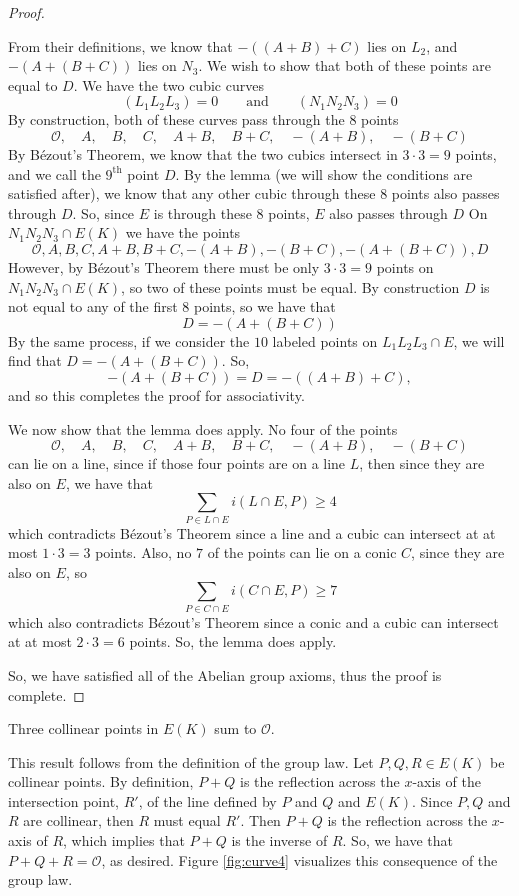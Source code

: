 \documentclass[]{math_paper}
\begin{document}
\begin{proof}
\begin{enumerate} [label = (\roman*)]
              From their definitions, we know that $-((A + B) + C)$ lies on $L_2$, and $-(A + (B + C))$ lies on $N_3$. We wish to show that both of these points are equal to $D$. We have the two cubic curves
              $$(L_1L_2L_3)= 0 \qquad \text{and} \qquad (N_1N_2N_3) = 0$$
              By construction, both of these curves pass through the $8$ points
              $$\mathcal{O}, \quad A, \quad B, \quad C, \quad A + B, \quad B + C, \quad -(A + B), \quad -(B + C)$$
              By Bézout's Theorem, we know that the two cubics intersect in $3 \cdot 3 = 9$ points, and we call the $9^{\text{th}}$ point $D$. By the lemma (we will show the conditions are satisfied after), we know that any other cubic through these $8$ points also passes through $D$. So, since $E$ is through these $8$ points, $E$ also passes through $D$ On $N_1N_2N_3 \cap E(K)$ we have the points
              $$\mathcal{O}, A, B, C, A+B, B+C, -(A + B), -(B + C), -(A + (B+C)), D$$
              However, by Bézout's Theorem there must be only $3 \cdot 3 = 9$ points on $N_1N_2N_3 \cap E(K)$, so two of these points must be equal. By construction $D$ is not equal to any of the first $8$ points, so we have that
              $$D = -(A + (B + C))$$
              By the same process, if we consider the $10$ labeled points on $L_1L_2L_3 \cap E$, we will find that $D = -(A + (B + C))$. So,
              $$-(A + (B + C)) = D = -((A + B) + C),$$
              and so this completes the proof for associativity.

              We now show that the lemma does apply. No four of the points
              $$\mathcal{O}, \quad A, \quad B, \quad C, \quad A + B, \quad B + C, \quad -(A + B), \quad -(B + C)$$
              can lie on a line, since if those four points are on a line $L$, then since they are also on $E$, we have that $$\sum_{P \in L \cap E}i(L \cap E, P) \geq 4$$
              which contradicts Bézout's Theorem since a line and a cubic can intersect at at most $1 \cdot 3 = 3$ points. Also, no $7$ of the points can lie on a conic $C$, since they are also on $E$, so
              $$\sum_{P \in C \cap E}i(C \cap E, P) \geq 7$$
              which also contradicts Bézout's Theorem since a conic and a cubic can intersect at at most $2 \cdot 3 = 6$ points. So, the lemma does apply.
    \end{enumerate}
    So, we have satisfied all of the Abelian group axioms, thus the proof is complete.
\end{proof}
\begin{example}
    Three collinear points in $E(K)$ sum to $\mathcal{O}$.
\end{example}
This result follows from the definition of the group law. Let $P, Q, R \in E(K)$ be collinear points. By definition, $P + Q$ is the reflection across the $x$-axis of the intersection point, $R'$, of the line defined by $P$ and $Q$ and $E(K)$. Since $P, Q$ and $R$ are collinear, then $R$ must equal $R'$. Then $P + Q$ is the reflection across the $x$-axis of $R$, which implies that $P + Q$ is the inverse of $R$. So, we have that $P + Q + R = \mathcal{O}$, as desired. Figure \ref{fig:curve4} visualizes this consequence of the group law.
\end{document}
